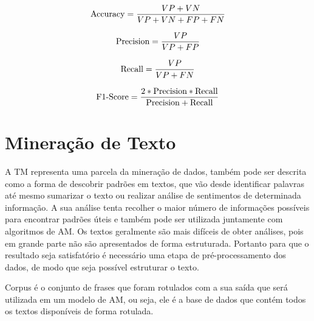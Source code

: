           \begin{equation}\label{acuracia}
            \begin{aligned}
              \textup{Accuracy} = \frac{VP+VN}{VP+VN+FP+FN}
          \end{aligned} 
          \end{equation}

          \begin{equation}\label{precision}
            \begin{aligned}
              \textup{Precision} = \frac{VP}{VP+FP}
          \end{aligned} 
          \end{equation}

          \begin{equation}\label{recall}
            \begin{aligned}
              \textup{Recall} = \frac{VP}{VP+FN}
          \end{aligned} 
          \end{equation}


          \begin{equation}\label{f1score}
            \begin{aligned}
              \textup{F$1$-Score} = \frac{2*\textup{Precision}*\textup{Recall}}{\textup{Precision}+\textup{Recall}}
          \end{aligned} 
          \end{equation}

\section{Mineração de Texto}

          A \acrshort{TM} representa uma parcela da mineração de dados, também pode ser descrita como a forma 
        de descobrir padrões em textos, que vão desde identificar palavras até mesmo sumarizar o texto ou realizar análise de sentimentos
        de determinada informação. A sua análise tenta recolher o maior número de informações possíveis para encontrar padrões úteis e também 
        pode ser utilizada juntamente com algoritmos de \acrshort{AM}. Os textos geralmente são mais difíceis de obter análises, pois em grande
        parte não são apresentados de forma estruturada. Portanto para que o resultado seja satisfatório é necessário uma etapa de pré-processamento
        dos dados, de modo que seja possível estruturar o texto.

            Corpus é o conjunto de frases que foram rotulados com a sua saída que será utilizada em um modelo de \acrshort{AM}, ou seja, ele é 
        a base de dados que contém todos os textos disponíveis de forma rotulada.

